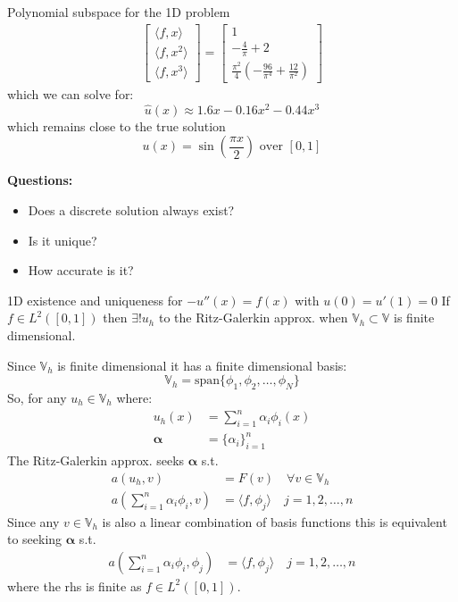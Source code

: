 \begin{example}{Polynomial subspace for the 1D problem}{}
\begin{align*}
\begin{bmatrix}
            \langle f, x \rangle   \\
            \langle f, x^2 \rangle \\
            \langle f, x^3 \rangle
        \end{bmatrix}
        = \begin{bmatrix}
              1                  \\
              -\frac{4}{\pi} + 2 \\
              \frac{\pi^2}{4} \left(-\frac{96}{\pi^4} + \frac{12}{\pi^2} \right)
          \end{bmatrix}
    \end{align*}
    which we can solve for:
    \[
        \hat{u}(x) \approx 1.6x - 0.16x^2 - 0.44x^3
    \]
    which remains close to the true solution
    \[
        u(x) = \sin(\frac{\pi x}{2}) \text{ over } [0, 1]
    \]
\end{example}

\textbf{Questions:}
\begin{itemize}
    \item Does a discrete solution always exist?
    \item Is it unique?
    \item How accurate is it?
\end{itemize}

\begin{theorem}{1D existence and uniqueness for $-u''(x) = f(x)$ with $u(0) = u'(1) = 0$}{}
    If $f \in L^2([0, 1])$ then $\exists! u_h$ to the Ritz-Galerkin approx. when $\mathbb{V}_h \subset \mathbb{V}$ is finite dimensional.
\end{theorem}
Since $\mathbb{V}_h$ is finite dimensional it has a finite dimensional basis:
\[\mathbb{V}_h = \text{span}\{\phi_1, \phi_2, \ldots, \phi_N\}\]
So, for any $u_h \in \mathbb{V}_h$ where:
\begin{align*}
    u_h(x)         & = \sum_{i=1}^n \alpha_i \phi_i(x) \\
    \symbf{\alpha} & = \{\alpha_i\}_{i=1}^n
\end{align*}
The Ritz-Galerkin approx. seeks $\symbf{\alpha}$ s.t.
\begin{align*}
    a(u_h, v)                                     & = F(v) \quad \forall v \in \mathbb{V}_h               \\
    a\left(\sum_{i=1}^n \alpha_i \phi_i, v\right) & = \langle f, \phi_j \rangle \quad j = 1, 2, \ldots, n
\end{align*}
Since any $v \in \mathbb{V}_h$ is also a linear combination of basis functions this is equivalent to seeking $\symbf{\alpha}$ s.t.
\begin{align*}
    a\left(\sum_{i=1}^n \alpha_i \phi_i, \phi_j\right) & = \langle f, \phi_j \rangle \quad j = 1, 2, \ldots, n
\end{align*}
where the rhs is finite as $f \in L^2([0, 1])$.

